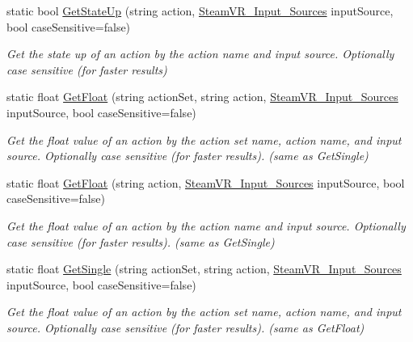 \begin{DoxyCompactItemize}
static bool \mbox{\hyperlink{class_valve_1_1_v_r_1_1_steam_v_r___input_a799db7338f4c49ed8fd862f0870bd8de}{Get\+State\+Up}} (string action, \mbox{\hyperlink{namespace_valve_1_1_v_r_a82e5bf501cc3aa155444ee3f0662853f}{Steam\+V\+R\+\_\+\+Input\+\_\+\+Sources}} input\+Source, bool case\+Sensitive=false)
\begin{DoxyCompactList}\small\item\em Get the state up of an action by the action name and input source. Optionally case sensitive (for faster results) \end{DoxyCompactList}\item 
static float \mbox{\hyperlink{class_valve_1_1_v_r_1_1_steam_v_r___input_a6528f5369dfdfe6c3b853a9135b29a68}{Get\+Float}} (string action\+Set, string action, \mbox{\hyperlink{namespace_valve_1_1_v_r_a82e5bf501cc3aa155444ee3f0662853f}{Steam\+V\+R\+\_\+\+Input\+\_\+\+Sources}} input\+Source, bool case\+Sensitive=false)
\begin{DoxyCompactList}\small\item\em Get the float value of an action by the action set name, action name, and input source. Optionally case sensitive (for faster results). (same as Get\+Single) \end{DoxyCompactList}\item 
static float \mbox{\hyperlink{class_valve_1_1_v_r_1_1_steam_v_r___input_af7db6783a8eca53004a0278cc547de1a}{Get\+Float}} (string action, \mbox{\hyperlink{namespace_valve_1_1_v_r_a82e5bf501cc3aa155444ee3f0662853f}{Steam\+V\+R\+\_\+\+Input\+\_\+\+Sources}} input\+Source, bool case\+Sensitive=false)
\begin{DoxyCompactList}\small\item\em Get the float value of an action by the action name and input source. Optionally case sensitive (for faster results). (same as Get\+Single) \end{DoxyCompactList}\item 
static float \mbox{\hyperlink{class_valve_1_1_v_r_1_1_steam_v_r___input_a4492764f7a824b7c1a073c05bb8bc145}{Get\+Single}} (string action\+Set, string action, \mbox{\hyperlink{namespace_valve_1_1_v_r_a82e5bf501cc3aa155444ee3f0662853f}{Steam\+V\+R\+\_\+\+Input\+\_\+\+Sources}} input\+Source, bool case\+Sensitive=false)
\begin{DoxyCompactList}\small\item\em Get the float value of an action by the action set name, action name, and input source. Optionally case sensitive (for faster results). (same as Get\+Float) \end{DoxyCompactList}\item 

\end{DoxyCompactItemize}
